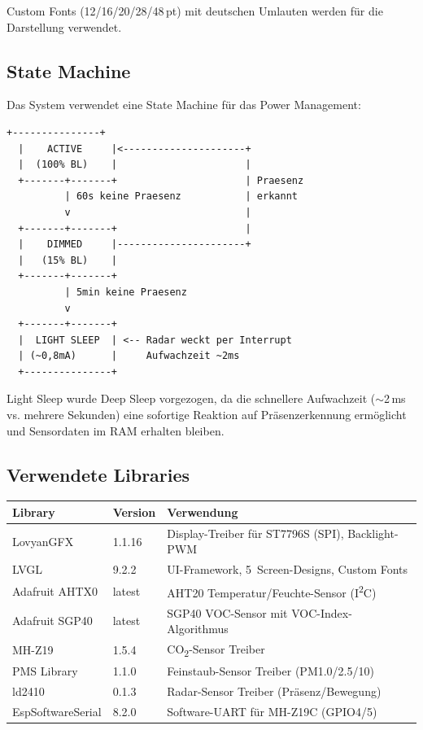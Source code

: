 \documentclass[a4paper,11pt]{article}
\begin{document}
Custom Fonts (12/16/20/28/48\,pt) mit deutschen Umlauten werden für die Darstellung verwendet.

\subsection{State Machine}

Das System verwendet eine State Machine für das Power Management:

\begin{lstlisting}[language={},basicstyle=\ttfamily\footnotesize]
  +---------------+
  |    ACTIVE     |<---------------------+
  |  (100% BL)    |                      |
  +-------+-------+                      | Praesenz
          | 60s keine Praesenz           | erkannt
          v                              |
  +-------+-------+                      |
  |    DIMMED     |----------------------+
  |   (15% BL)    |
  +-------+-------+
          | 5min keine Praesenz
          v
  +-------+-------+
  |  LIGHT SLEEP  | <-- Radar weckt per Interrupt
  | (~0,8mA)      |     Aufwachzeit ~2ms
  +---------------+
\end{lstlisting}

Light Sleep wurde Deep Sleep vorgezogen, da die schnellere Aufwachzeit (${\sim}$2\,ms vs. mehrere Sekunden) eine sofortige Reaktion auf Präsenzerkennung ermöglicht und Sensordaten im RAM erhalten bleiben.

\subsection{Verwendete Libraries}

\begin{longtable}{p{3.5cm} p{2cm} p{6.5cm}}
\toprule
\rowcolor{tableheader}
\textbf{Library} & \textbf{Version} & \textbf{Verwendung} \\
\midrule
\endhead

LovyanGFX & 1.1.16 & Display-Treiber für ST7796S (SPI), Backlight-PWM \\
LVGL & 9.2.2 & UI-Framework, 5~Screen-Designs, Custom Fonts \\
Adafruit AHTX0 & latest & AHT20 Temperatur/Feuchte-Sensor (I\textsuperscript{2}C) \\
Adafruit SGP40 & latest & SGP40 VOC-Sensor mit VOC-Index-Algorithmus \\
MH-Z19 & 1.5.4 & CO\textsubscript{2}-Sensor Treiber \\
PMS Library & 1.1.0 & Feinstaub-Sensor Treiber (PM1.0/2.5/10) \\
ld2410 & 0.1.3 & Radar-Sensor Treiber (Präsenz/Bewegung) \\
EspSoftwareSerial & 8.2.0 & Software-UART für MH-Z19C (GPIO4/5) \\

\bottomrule
\end{longtable}
\end{document}
